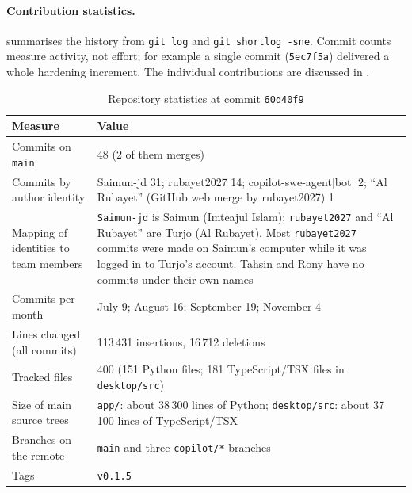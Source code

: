 
\paragraph{Contribution statistics.}
 summarises the history from \texttt{git log} and
\texttt{git shortlog -sne}. Commit counts measure activity, not effort; for example a
single commit (\texttt{5ec7f5a}) delivered a whole hardening increment. The individual
contributions are discussed in .

\begin{table}[htbp]
\centering\small
\caption{Repository statistics at commit \texttt{60d40f9}}\label{tab:git_stats}
\begin{tabularx}{\textwidth}{@{}lX@{}}
\toprule
\textbf{Measure} & \textbf{Value}\\
\midrule
Commits on \texttt{main} & 48 (2 of them merges)\\
Commits by author identity & Saimun-jd 31; rubayet2027 14; copilot-swe-agent[bot] 2; ``Al Rubayet'' (GitHub web merge by rubayet2027) 1\\
Mapping of identities to team members & \texttt{Saimun-jd} is Saimun (Imteajul Islam); \texttt{rubayet2027} and ``Al Rubayet'' are Turjo (Al Rubayet). Most \texttt{rubayet2027} commits were made on Saimun's computer while it was logged in to Turjo's account. Tahsin and Rony have no commits under their own names\\
Commits per month & July 9; August 16; September 19; November 4\\
Lines changed (all commits) & 113\,431 insertions, 16\,712 deletions\\
Tracked files & 400 (151 Python files; 181 TypeScript/TSX files in \texttt{desktop/src})\\
Size of main source trees & \texttt{app/}: about 38\,300 lines of Python; \texttt{desktop/src}: about 37\,100 lines of TypeScript/TSX\\
Branches on the remote & \texttt{main} and three \texttt{copilot/*} branches\\
Tags & \texttt{v0.1.5}\\
\bottomrule
\end{tabularx}
\end{table}
